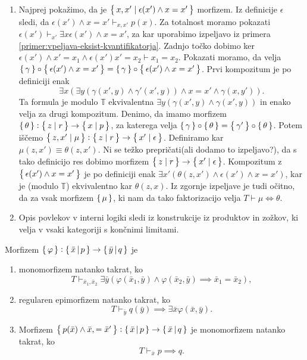 \documentclass[../kategoricna_logika.tex]{subfiles}
\begin{document}
\begin{dokaz}
\begin{enumerate}[label=(\roman*)]
  \item Najprej pokažimo, da je $\left\lbrace\,x,x' \mid \epsilon(x') \land x = x'\,\right\rbrace$ morfizem.
    Iz definicije $\epsilon$ sledi, da $\epsilon(x') \land x = x' \vdash_{x,x'} p(x)$.
    Za totalnost moramo pokazati $\epsilon(x') \vdash_{x'} \exists x \epsilon(x') \land x=x'$,
    za kar uporabimo izpeljavo iz primera \ref{primer:vpeljava-eksist-kvantifikatorja}.
    Zadnjo točko dobimo ker $\epsilon(x') \land x'=x_1 \land \epsilon(x') x'= x_2 \vdash x_1 = x_2$.
    Pokazati moramo, da velja $\left\lbrace\,\gamma\,\right\rbrace \circ \left\lbrace\,\epsilon(x') \land x = x'\,\right\rbrace =
    \left\lbrace\,\gamma\,\right\rbrace \circ \left\lbrace\,\epsilon(x') \land x = x'\,\right\rbrace$.
    Prvi kompozitum je po definiciji enak
    \[\exists x( \exists y(\gamma(x',y) \land \gamma'(x',y)) \land x = x' \land \gamma(x,y')). \]
    Ta formula je modulo $\mathbb{T}$ ekvivalentna $\exists y(\gamma(x',y) \land \gamma(x',y))$
    in enako velja za drugi kompozitum.
    Denimo, da imamo morfizem $\left\lbrace\,\theta\,\right\rbrace : \left\lbrace\,z \mid r\,\right\rbrace \to \left\lbrace\,x \mid p\,\right\rbrace$,
    za katerega velja $\left\lbrace\,\gamma\,\right\rbrace \circ \left\lbrace\,\theta\,\right\rbrace = \left\lbrace\,\gamma'\,\right\rbrace \circ \left\lbrace\,\theta\,\right\rbrace$.
    Potem iščemo $\left\lbrace\,z,x' \mid \mu\,\right\rbrace : \left\lbrace\,z \mid r\,\right\rbrace \to \left\lbrace\,x' \mid \epsilon\,\right\rbrace$.
    Definiramo kar $\mu(z,x') \equiv  \theta(z,x')$. Ni se težko prepričati(ali dodamo to izpeljavo?),
    da s tako definicijo res dobimo morfizem $\left\lbrace\,z \mid r\,\right\rbrace \to \left\lbrace\,x' \mid \epsilon\,\right\rbrace$.
    Kompozitum z $\left\lbrace\,\epsilon(x') \land x = x'\,\right\rbrace$ je po definiciji enak
    $\exists x' (\theta(z,x') \land \epsilon(x') \land x=x')$, kar
    je (modulo $\mathbb{T}$) ekvivalentno kar $\theta(z,x)$.
    Iz zgornje izpeljave je tudi očitno, da za vsak morfizem $\left\lbrace\,\mu\,\right\rbrace$,
    ki nam da tako faktorizacijo velja $T \vdash \mu \iff \theta$.

  \item Opis povlekov v interni logiki sledi iz konstrukcije iz produktov
    in zožkov, ki velja v vsaki kategoriji s končnimi limitami.
  \end{enumerate}
\end{dokaz}
\begin{lema}\label{lema:morfizmi-v-sintakticni-kategoriji}
  Morfizem $\left\lbrace\,\varphi\,\right\rbrace : \left\lbrace\,\bar{x}\,\middle|\, p\,\right\rbrace \to \left\lbrace\,\bar{y}\,\middle|\, q\,\right\rbrace$ je
  \begin{enumerate}[label=(\roman*)]
    \item monomorfizem natanko takrat, ko
      $$T \vdash_{\bar{x}_1,\bar{x}_2}  \exists \bar{y} \left( \varphi(\bar{x}_1,\bar{y}) \wedge \varphi(\bar{x}_2,\bar{y}) \implies \bar{x}_1 = \bar{x}_2 \right),$$
    \item regularen epimorfizem natanko takrat, ko
      $$T \vdash_{\bar{y}} q(\bar{y}) \implies \exists \bar{x} \varphi(\bar{x},\bar{y}).$$
    \item Morfizem $\left\lbrace\,p(\bar{x}) \wedge \bar{x}, = \bar{x}'\,\right\rbrace : \left\lbrace\,\bar{x}\,\middle|\, p \,\right\rbrace \to \left\lbrace\,\bar{x}\,\middle|\, q\,\right\rbrace$ je monomorfizem natanko takrat, ko
      $$T \vdash_{\bar{x}} p \implies q.$$
  \end{enumerate}
\end{lema}
\end{document}
